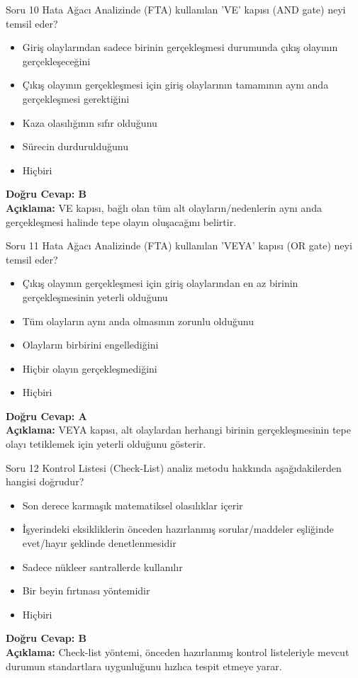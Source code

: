 \documentclass[12pt,a4paper]{article}
\begin{document}
\begin{testcard}{Soru 10}
    Hata Ağacı Analizinde (FTA) kullanılan 'VE' kapısı (AND gate) neyi temsil eder?
    \begin{itemize}
        \item[A)] Giriş olaylarından sadece birinin gerçekleşmesi durumunda çıkış olayının gerçekleşeceğini
        \item[B)] Çıkış olayının gerçekleşmesi için giriş olaylarının tamamının aynı anda gerçekleşmesi gerektiğini
        \item[C)] Kaza olasılığının sıfır olduğunu
        \item[D)] Sürecin durdurulduğunu
        \item[E)] Hiçbiri
    \end{itemize}
    \tcblower
    \textbf{Doğru Cevap: B} \\
    \textbf{Açıklama:} VE kapısı, bağlı olan tüm alt olayların/nedenlerin aynı anda gerçekleşmesi halinde tepe olayın oluşacağını belirtir.
\end{testcard}

\begin{testcard}{Soru 11}
    Hata Ağacı Analizinde (FTA) kullanılan 'VEYA' kapısı (OR gate) neyi temsil eder?
    \begin{itemize}
        \item[A)] Çıkış olayının gerçekleşmesi için giriş olaylarından en az birinin gerçekleşmesinin yeterli olduğunu
        \item[B)] Tüm olayların aynı anda olmasının zorunlu olduğunu
        \item[C)] Olayların birbirini engellediğini
        \item[D)] Hiçbir olayın gerçekleşmediğini
        \item[E)] Hiçbiri
    \end{itemize}
    \tcblower
    \textbf{Doğru Cevap: A} \\
    \textbf{Açıklama:} VEYA kapısı, alt olaylardan herhangi birinin gerçekleşmesinin tepe olayı tetiklemek için yeterli olduğunu gösterir.
\end{testcard}

\begin{testcard}{Soru 12}
    Kontrol Listesi (Check-List) analiz metodu hakkında aşağıdakilerden hangisi doğrudur?
    \begin{itemize}
        \item[A)] Son derece karmaşık matematiksel olasılıklar içerir
        \item[B)] İşyerindeki eksikliklerin önceden hazırlanmış sorular/maddeler eşliğinde evet/hayır şeklinde denetlenmesidir
        \item[C)] Sadece nükleer santrallerde kullanılır
        \item[D)] Bir beyin fırtınası yöntemidir
        \item[E)] Hiçbiri
    \end{itemize}
    \tcblower
    \textbf{Doğru Cevap: B} \\
    \textbf{Açıklama:} Check-list yöntemi, önceden hazırlanmış kontrol listeleriyle mevcut durumun standartlara uygunluğunu hızlıca tespit etmeye yarar.
\end{testcard}
\end{document}
